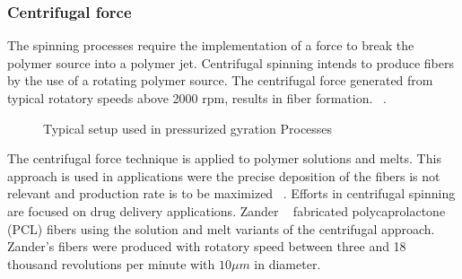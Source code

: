 \documentclass[5p,,preprint,12pt,twocolumn]{elsarticle}
\makeatletter
\def\fixFloatSize#1{}%
\makeatother
\begin{document}
\subsubsection{Centrifugal force}The spinning processes require the implementation of a force to break the polymer source into a polymer jet. Centrifugal spinning intends to produce fibers by the use of a rotating polymer source. The centrifugal force generated from typical rotatory speeds above 2000 rpm, results in fiber formation. \unskip~\cite{527120:13535559,527120:13535561}.


\bgroup
\fixFloatSize{images/19c94c11-1ae0-47bd-95ef-4dc5ceedc20d-uimg_gyro_es.png}
\begin{figure}[!htbp]
\centering \makeatletter{}
\makeatother 
\caption{{Typical setup used in pressurized gyration Processes}}
\label{f-7cf6ac702e28}
\end{figure}
\egroup
The centrifugal force technique is applied to polymer solutions and melts. This approach is used in applications were the precise deposition of the fibers is not relevant and production rate is to be maximized \unskip~\cite{527120:13535894}.  Efforts in centrifugal spinning are focused on drug delivery applications. Zander \unskip~\cite{527120:13535977} fabricated polycaprolactone (PCL) fibers using the solution and melt variants of the centrifugal approach. Zander's fibers were produced with rotatory speed between three and 18 thousand revolutions per minute with $10 \mu m $ in diameter. 
\end{document}
